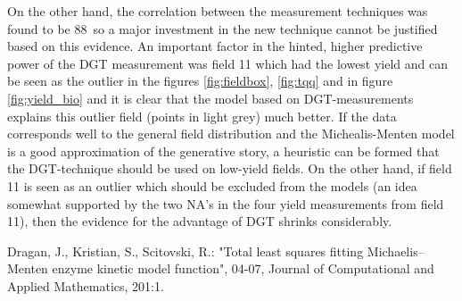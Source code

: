 \documentclass[11pt,fleqn]{article}
\begin{document}
On the other hand, the correlation between the measurement techniques was found to be 88\pro\ so a major investment in the new technique cannot be justified based on this evidence. 
An important factor in the hinted, higher predictive power of the DGT measurement was field 11 which had the lowest yield and can be seen as the outlier in the figures \ref{fig:fieldbox}, \ref{fig:tqq} and in figure \ref{fig:yield_bio} and it is clear that the model based on DGT-measurements explains this outlier field (points in light grey) much better. 
If the data corresponds well to the general field distribution and the Michealis-Menten model is a good approximation of the generative story, a heuristic can be formed that the DGT-technique should be used on low-yield fields. 
On the other hand, if field 11 is seen as an outlier which should be excluded from the models (an idea somewhat supported by the two NA's in the four yield measurements from field 11), then the evidence for the advantage of DGT shrinks considerably.

\newpage 
\begin{thebibliography}{9}
	Dragan, J., Kristian, S., Scitovski, R.: "Total least squares fitting Michaelis–Menten enzyme kinetic model function", 04-07, Journal of Computational and Applied Mathematics, 201:1. 

\end{thebibliography}
\end{document}
